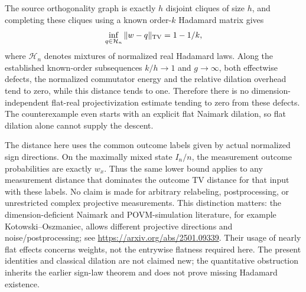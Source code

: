The source orthogonality graph is exactly $h$ disjoint cliques of
size $h$, and completing these cliques using a known order-$k$
Hadamard matrix gives
\[
 \inf_{q\in\mathcal H_n}\|w-q\|_{\rm TV}=1-1/k,
\]
where $\mathcal H_n$ denotes mixtures of normalized real Hadamard
laws. Along the established known-order subsequences $k/h\to1$ and
$g\to\infty$, both effectwise defects, the normalized commutator
energy and the relative dilation overhead tend to zero, while this
distance tends to one. Therefore there is no dimension-independent
flat-real projectivization estimate tending to zero from these
defects. The counterexample even starts with an explicit flat
Naimark dilation, so flat dilation alone cannot supply the descent.

The distance here uses the common outcome labels given by actual
normalized sign directions. On the maximally mixed state $I_n/n$,
the measurement outcome probabilities are exactly $w_x$. Thus the
same lower bound applies to any measurement distance that dominates
the outcome TV distance for that input with these labels. No claim
is made for arbitrary relabeling, postprocessing, or unrestricted
complex projective measurements. This distinction matters: the
dimension-deficient Naimark and POVM-simulation literature, for
example Kotowski--Oszmaniec, allows different projective directions
and noise/postprocessing; see
\url{https://arxiv.org/abs/2501.09339}. Their usage of nearly flat
effects concerns weights, not the entrywise flatness required here.
The present identities and classical dilation are not claimed new;
the quantitative obstruction inherits the earlier sign-law theorem
and does not prove missing Hadamard existence.
